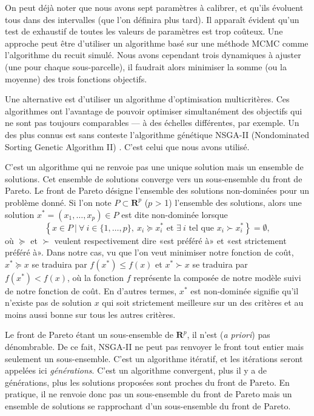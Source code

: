 On peut déjà noter que nous avons sept paramètres à calibrer, et qu'ils évoluent tous dans des intervalles (que l'on définira plus tard).
Il apparaît évident qu'un test de exhaustif de toutes les valeurs de paramètres est trop coûteux.
Une approche peut être d'utiliser un algorithme basé sur une méthode MCMC comme l'algorithme du recuit simulé.
Nous avons cependant trois dynamiques à ajuster (une pour chaque sous-parcelle), il faudrait alors minimiser la somme (ou la moyenne) des trois fonctions objectifs.

Une alternative est d'utiliser un algorithme d'optimisation multicritères.
Ces algorithmes ont l'avantage de pouvoir optimiser simultanément des objectifs qui ne sont pas toujours comparables --- à des échelles différentes, par exemple.
Un des plus connus est sans conteste l'algorithme génétique NSGA-II (Nondominated Sorting Genetic Algorithm II) \citep{deb}.
C'est celui que nous avons utilisé.

C'est un algorithme qui ne renvoie pas une unique solution mais un ensemble de solutions. 
Cet ensemble de solutions converge vers un sous-ensemble du front de Pareto.
Le front de Pareto désigne l'ensemble des solutions non-dominées pour un problème donné.
Si l'on note $P \subset \mathbf{R}^{p}$ ($p$ > 1) l'ensemble des solutions, alors une solution $x^* = \left( x_1, \ldots, x_p \right) \in  P$ est dite non-dominée lorsque
\[
\left\{ x \in P\ |\ \forall\ i \in \{1, \ldots, p\},\ x_i \succcurlyeq x_i^* \text{ et } \exists\ i \text{ tel que } x_i \succ x_i^* \right\} = \emptyset,
\]
où $\succcurlyeq$ et $\succ$ veulent respectivement dire «est préféré à» et «est strictement préféré à». 
Dans notre cas, vu que l'on veut minimiser notre fonction de coût, $x^* \succcurlyeq x$ se traduira par $f(x^*) \leq f(x)$ et $x^* \succ x$ se traduira par $ f(x^*) < f(x)$, où la fonction $f$ représente la composée de notre modèle suivi de notre fonction de coût.
En d'autres termes, $x^*$ est non-dominée signifie qu'il n'existe pas de solution $x$ qui soit strictement meilleure sur un des critères et au moins aussi bonne sur tous les autres critères.

Le front de Pareto étant un sous-ensemble de $\mathbf{R}^{p}$, il n'est (\emph{a priori}) pas dénombrable.
De ce fait, NSGA-II ne peut pas renvoyer le front tout entier mais seulement un sous-ensemble.
C'est un algorithme itératif, et les itérations seront appelées ici \emph{générations}.
C'est un algorithme convergent, plus il y a de générations, plus les solutions proposées sont proches du front de Pareto.
En pratique, il ne renvoie donc pas un sous-ensemble du front de Pareto mais un ensemble de solutions se rapprochant d'un sous-ensemble du front de Pareto.

